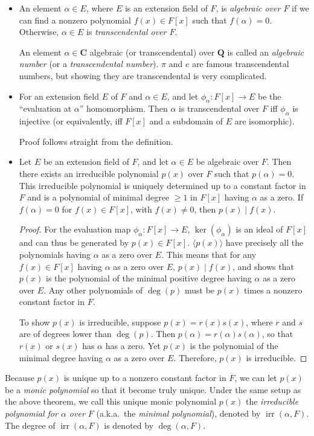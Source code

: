 \documentclass[11pt]{article}
\newcommand{\Q}{\mathbf{Q}}
\newcommand{\C}{\mathbf{C}}
\newcommand{\df}[1]{\textit{\textsf{#1}}}
\newcommand{\gen}[1]{\langle #1 \rangle}
\newcommand{\irr}{\operatorname{irr}}
\begin{document}
\begin{itemize}
    \item An element $\alpha \in E$, where $E$ is an extension field of $F$, is \df{algebraic over $F$} if we can find a nonzero polynomial $f(x) \in F[x]$ such that $f(\alpha) = 0$. Otherwise, $\alpha \in E$ is \df{transcendental over $F$}.
    
    An element $\alpha \in \C$ algebraic (or transcendental) over $\Q$ is called an \df{algebraic number} (or a \df{transcendental number}). $\pi$ and $e$ are famous transcendental numbers, but showing they are transcendental is very complicated.
    \item For an extension field $E$ of $F$ and $\alpha \in E$, and let $\phi_\alpha: F[x] \to E$ be the ``evaluation at $\alpha$'' homomorphism. Then $\alpha$ is transcendental over $F$ iff $\phi_\alpha$ is injective (or equivalently, iff $F[x]$ and a subdomain of $E$ are isomorphic).

    Proof follows straight from the definition.
    \item Let $E$ be an extension field of $F$, and let $\alpha \in E$ be algebraic over $F$. Then there exists an irreducible polynomial $p(x)$ over $F$ such that $p(\alpha) = 0$. This irreducible polynomial is uniquely determined up to a constant factor in $F$ and is a polynomial of minimal degree $\geq 1$ in $F[x]$ having $\alpha$ as a zero. If $f(\alpha) = 0$ for $f(x) \in F[x]$, with $f(x) \neq 0$, then $p(x) \mid f(x)$.
    \begin{proof}
        For the evaluation map $\phi_\alpha: F[x] \to E$, $\ker(\phi_\alpha)$ is an ideal of $F[x]$ and can thus be generated by $p(x) \in F[x]$. $\gen{p(x)}$ have precisely all the polynomials having $\alpha$ as a zero over $E$. This means that for any $f(x) \in F[x]$ having $\alpha$ as a zero over $E$, $p(x) \mid f(x)$, and shows that $p(x)$ is the polynomial of the minimal positive degree having $\alpha$ as a zero over $E$. Any other polynomials of $\deg(p)$ must be $p(x)$ times a nonzero constant factor in $F$.

        To show $p(x)$ is irreducible, suppose $p(x) = r(x)s(x)$, where $r$ and $s$ are of degrees lower than $\deg(p)$. Then $p(\alpha) = r(\alpha)s(\alpha)$, so that $r(x)$ or $s(x)$ has $\alpha$ has a zero. Yet $p(x)$ is the polynomial of the minimal degree having $\alpha$ as a zero over $E$. Therefore, $p(x)$ is irreducible.
    \end{proof}  
\end{itemize}
\begin{framed}
    Because $p(x)$ is unique up to a nonzero constant factor in $F$, we can let $p(x)$ be a \emph{monic polynomial} so that it become truly unique. Under the same setup as the above theorem, we call this unique monic polynomial $p(x)$ the \df{irreducible polynomial for $\alpha$ over $F$} (a.k.a.\ the \df{minimal polynomial}), denoted by $\irr(\alpha,F)$. The degree of $\irr(\alpha,F)$ is denoted by $\deg(\alpha,F)$.
\end{framed}
\end{document}
